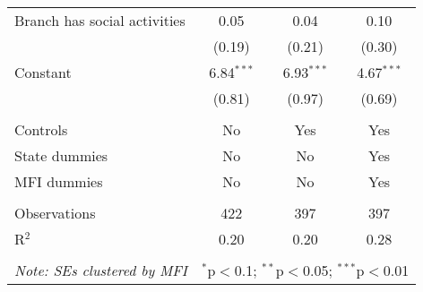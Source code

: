 \documentclass[11pt]{article}
\begin{document}
\begin{table}[!htbp]
\begin{tabular}{@{\extracolsep{5pt}}lccc}
  Branch has social activities & 0.05 & 0.04 & 0.10 \\ 
  & (0.19) & (0.21) & (0.30) \\ 
  Constant & 6.84$^{***}$ & 6.93$^{***}$ & 4.67$^{***}$ \\ 
  & (0.81) & (0.97) & (0.69) \\ 
 \hline \\[-1.8ex]  
Controls & No & Yes & Yes \\ 
State dummies & No & No & Yes \\ 
MFI dummies & No & No & Yes \\ 
\hline \\[-1.8ex] 
Observations & 422 & 397 & 397 \\ 
R$^{2}$ & 0.20 & 0.20 & 0.28 \\ 
\hline 
\hline \\[-1.8ex] 
\textit{Note: SEs clustered by MFI}  & \multicolumn{3}{r}{$^{*}$p$<$0.1; $^{**}$p$<$0.05; $^{***}$p$<$0.01} \\ 
\end{tabular} 
\end{table} 
\end{document}
